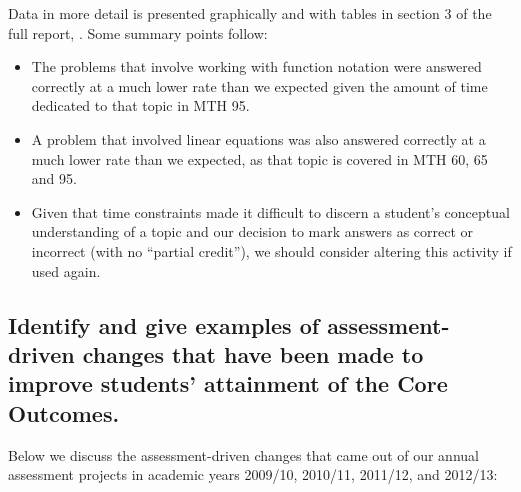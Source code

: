 \begin{description}
	      Data in more detail is presented graphically and with tables in section 3 of the full report, \cite{annualLASreport2012}.
	      Some summary points follow:
	      \begin{itemize}
		      \item The problems that involve working with function notation were answered correctly at a much lower rate than we expected given the amount of time dedicated to that topic in MTH 95.
		      \item A problem that involved linear equations was also answered correctly at a much lower rate than we expected, as that topic is covered in MTH 60, 65 and 95.
		      \item Given that time constraints made it difficult to discern a student's conceptual understanding of a topic and our decision to mark answers as correct or incorrect (with no ``partial credit''), we should consider altering this activity if used again.
	      \end{itemize}
\end{description}

\subsection[Assessment-driven changes]{Identify and give examples of assessment-driven changes that have
	been made to improve students' attainment of the Core Outcomes.}

Below we discuss the assessment-driven changes that came out of our annual assessment projects in academic years 2009/10, 2010/11, 2011/12, and 2012/13:

